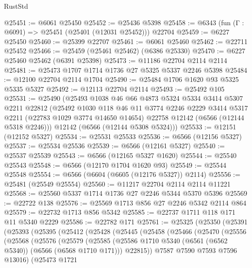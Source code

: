 \begin{lexlean}{RustStd}
\begin{coremodule}
{\begin{coremodule}
{{{{{{{{{{{{{{{{{{{{{{{{{{@25451 := @6061 @25450
@25452 := @25436 @5398
@25458 := @6343 (fun (Γ : @6091) => @25451 (@25401 (@12031 @25452))) @22704
@25459 := @6227 @25450
@25460 := @25399 @22707
@25461 := @6061 @25460
@25462 := @22711 @25452
@25466 := @25459 (@25461 @25462) (@6386 @25330)
@25470 := @6227 @25460 @25462 (@6391 @25398)
@25473 := @11186 @22704 @2114 @2114
@25481 := @25473 @1707 @1714 @1736 @27 @5325 @5337 @2246 @5398
@25484 := @12100 @22704 @2114 @1704
@25490 := @25484 @1706 @1620 @93 @5325 @5335 @5327
@25492 := @12113 @22704 @2114
@25493 := @25492 @105
@25531 := @25490
    (@25493
      @1038
      @46
      @66
      @4873
      @5324
      @5334
      @3414
      @5307
      @2211
      @22812
      (@25492
        @1030
        @118
        @46
        @11
        @3774
        @2246
        @2229
        @3414
        @5317
        @2211
        (@22783 @1029 @3774 @14650 @14654)
        @22758
        @12142
        (@6566 (@12144 @5318 @2246)))
      @12142
      (@6566 (@12144 @5308 @5324)))
@25533 := @12151 (@12152 @5327)
@25534 := @25531 @25533
@25536 := @6566 (@12156 @5327)
@25537 := @25534 @25536
@25539 := @6566 (@12161 @5327)
@25540 := @25537 @25539
@25543 := @6566 (@12165 @5327 @1620)
@25544 := @25540 @25543
@25548 := @6566 (@12170 @1704 @1620 @93)
@25549 := @25544 @25548
@25554 := @6566 (@6604 (@6605 (@12176 @5327)) @2114)
@25556 := @25481 (@25549 @25554)
@25560 := @11217 @22704 @2114 @2114 @11221
@25568 := @25560 @5337 @1714 @1736 @27 @2246 @5344 @5370 @5396
@25569 := @22722 @138
@25576 := @25569 @1713 @856 @27 @2246 @5342 @2114 @864
@25579 := @22732 @1713 @856 @5342
@25585 := @22737 @1711 @118 @171 @11 @5340 @2229
@25586 := @22782 @171
@25761 := @25325
    (@25350
      (@25391
        (@25393
          (@25395
            (@25412
              (@25428
                (@25445
                  (@25458
                    (@25466
                      (@25470
                        (@25556
                          (@25568
                            (@25576
                              (@25579
                                (@25585
                                  (@25586
                                    @1710
                                    @5340
                                    (@6561 (@6562 @5340))
                                    (@6566 (@6568 @1710 @171)))
                                  @22815))
                              @7587
                              @7590
                              @7593
                              @7596
                              @13016)
                            (@25473
                              @1721
}}}}}}}}}}}}}}}}}}}}}}}}}}
\end{coremodule}}
\end{coremodule}
\end{lexlean}
